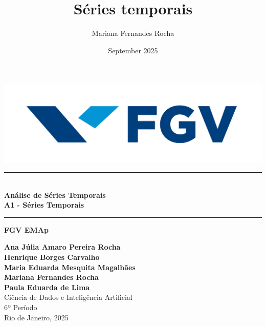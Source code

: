 \documentclass{article}
\title{Séries temporais}
\author{Mariana Fernandes Rocha}
\date{September 2025}
\begin{document}
\begin{titlepage}
    \begin{center}

        \vspace{1cm}
        \begin{minipage}{0.45\textwidth}
            \centering
            \includegraphics[width=1.2\textwidth]{images/logo_fgv.png}    
        \end{minipage}
        \vspace{2cm}

        \rule{1\textwidth}{0.4pt} \\ %
        \vspace{0.2cm}
        {\Huge \textbf{Análise de Séries Temporais}} \\
        \vspace{0.2cm}
        \vspace{0.5cm}
        {\Large \textbf{A1 - Séries Temporais}}\\
        \rule{1\textwidth}{0.4pt} %


        \vspace{0.5cm}
        {\Large \textbf{FGV EMAp}} \\
        \vspace{2cm}
        
        

        
        
        
        {\large 
            \textbf{Ana Júlia Amaro Pereira Rocha} \\ 
            \textbf{Henrique Borges Carvalho} \\
            \textbf{Maria Eduarda Mesquita Magalhães}\\
            \textbf{Mariana Fernandes Rocha} \\
            \textbf{Paula Eduarda de Lima}}\\[1.5cm]
        
        {\large 
            Ciência de Dados e Inteligência Artificial \\ 
            6º Período}\\[2cm]
        
        \vfill
        {\large Rio de Janeiro, 2025}

        
    \end{center}
\end{titlepage}
\end{document}
